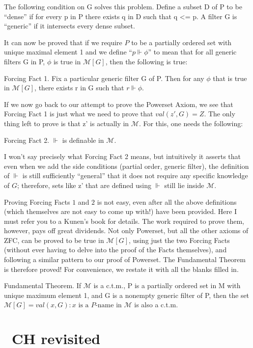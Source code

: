 \documentclass[10pt]{article}
\newcommand\axiom[1]{\textmd{#1}}
\begin{document}
The following condition on G solves this problem. Define a subset D of P to be ``dense'' if for every p in P there exists q in D such that q <= p. A filter G is ``generic'' if it intersects every dense subset.

It can now be proved that if we require $P$ to be a partially ordered set with unique maximal element 1 and we define ``$p \Vdash \phi$'' to mean that for all generic filters G in P, $\phi$ is true in $\mathcal{M}[G]$, then the following is true:

Forcing Fact 1. Fix a particular generic filter G of P. Then for any $\phi$ that is true in $\mathcal{M}[G]$, there exists r in G such that $r \Vdash \phi$.

If we now go back to our attempt to prove the Powerset Axiom, we see that Forcing Fact 1 is just what we need to prove that $val(z',G) = Z$. The only thing left to prove is that z' is actually in $\mathcal M$. For this, one needs the following:

Forcing Fact 2. $\Vdash$ is definable in $\mathcal M$.

I won't say precisely what Forcing Fact 2 means, but intuitively it asserts that even when we add the side conditions (partial order, generic filter), the definition of $\Vdash$ is still sufficiently ``general'' that it does not require any specific knowledge of $G$; therefore, sets like z' that are defined using $\Vdash$ still lie inside $\mathcal{M}$.

Proving Forcing Facts $1$ and $2$ is not easy, even after all the above definitions (which themselves are not easy to come up with!) have been provided. Here I must refer you to a Kunen's book for details. The work required to prove them, however, pays off great dividends. Not only Powerset, but all the other axioms of \axiom{ZFC}, can be proved to be true in $\mathcal{M}[G]$, using just the two Forcing Facts (without ever having to delve into the proof of the Facts themselves), and following a similar pattern to our proof of Powerset. The Fundamental Theorem is therefore proved! For convenience, we restate it with all the blanks filled in.

Fundamental Theorem. If $\mathcal{M}$ is a c.t.m., P is a partially ordered set in M with unique maximum element 1, and G is a nonempty generic filter of P, then the set $\mathcal{M}[G] = {val(x,G) : x \text{ is a }P\text{-name in }\mathcal M}$ is also a c.t.m.


\section{\axiom{~CH} revisited}
\end{document}
